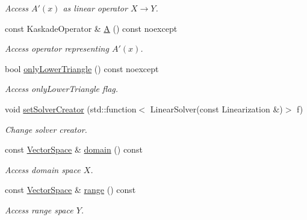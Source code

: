 \begin{DoxyCompactItemize}
\begin{DoxyCompactList}\small\item\em \-Access $A'(x)$ as linear operator $X\rightarrow Y$. \end{DoxyCompactList}\item 
\hypertarget{classSpacy_1_1Kaskade_1_1C1Operator_ab050915a62f3f8bf25e78af1e1289cb8}{const \-Kaskade\-Operator \& \hyperlink{classSpacy_1_1Kaskade_1_1C1Operator_ab050915a62f3f8bf25e78af1e1289cb8}{\-A} () const noexcept}\label{classSpacy_1_1Kaskade_1_1C1Operator_ab050915a62f3f8bf25e78af1e1289cb8}

\begin{DoxyCompactList}\small\item\em \-Access operator representing $A'(x)$. \end{DoxyCompactList}\item 
bool \hyperlink{classSpacy_1_1Kaskade_1_1C1Operator_adb85b50e1cc87fb342412560353c2f73}{only\-Lower\-Triangle} () const noexcept
\begin{DoxyCompactList}\small\item\em \-Access only\-Lower\-Triangle flag. \end{DoxyCompactList}\item 
void \hyperlink{classSpacy_1_1Kaskade_1_1C1Operator_aa0c69955542db6b0f61807181874b4d9}{set\-Solver\-Creator} (std\-::function$<$ \-Linear\-Solver(const \-Linearization \&)$>$ f)
\begin{DoxyCompactList}\small\item\em \-Change solver creator. \end{DoxyCompactList}\item 
\hypertarget{classSpacy_1_1OperatorBase_a2588f9b3e0188820c4c494e63293dc6f}{const \hyperlink{classSpacy_1_1VectorSpace}{\-Vector\-Space} \& \hyperlink{classSpacy_1_1OperatorBase_a2588f9b3e0188820c4c494e63293dc6f}{domain} () const }\label{classSpacy_1_1OperatorBase_a2588f9b3e0188820c4c494e63293dc6f}

\begin{DoxyCompactList}\small\item\em \-Access domain space $X$. \end{DoxyCompactList}\item 
\hypertarget{classSpacy_1_1OperatorBase_ab19d3b7a6f290b1079248f1e567e53d6}{const \hyperlink{classSpacy_1_1VectorSpace}{\-Vector\-Space} \& \hyperlink{classSpacy_1_1OperatorBase_ab19d3b7a6f290b1079248f1e567e53d6}{range} () const }\label{classSpacy_1_1OperatorBase_ab19d3b7a6f290b1079248f1e567e53d6}

\begin{DoxyCompactList}\small\item\em \-Access range space $Y$. \end{DoxyCompactList}\end{DoxyCompactItemize}


